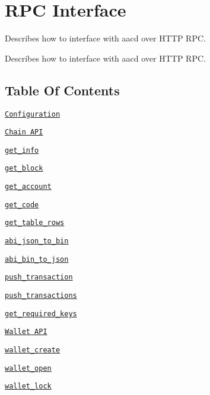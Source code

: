 \hypertarget{group__aaciorpc}{}\section{R\+PC Interface}
\label{group__aaciorpc}


Describes how to interface with aacd over H\+T\+TP R\+PC.  


Describes how to interface with aacd over H\+T\+TP R\+PC. 

\hypertarget{group__aaciorpc_tableofcontent}{}\subsection{Table Of Contents}\label{group__aaciorpc_tableofcontent}

\begin{DoxyItemize}
\item \href{#configuration}{\tt Configuration}
\item \href{#chainrpc}{\tt Chain A\+PI}
\begin{DoxyItemize}
\item \href{#v1chaingetinfo}{\tt get\+\_\+info}
\item \href{#v1chaingetblock}{\tt get\+\_\+block}
\item \href{#v1chaingetaccount}{\tt get\+\_\+account}
\item \href{#v1chaingetcode}{\tt get\+\_\+code}
\item \href{#v1chaingettablerows}{\tt get\+\_\+table\+\_\+rows}
\item \href{#v1chainabijsontobin}{\tt abi\+\_\+json\+\_\+to\+\_\+bin}
\item \href{#v1chainabibintojson}{\tt abi\+\_\+bin\+\_\+to\+\_\+json}
\item \href{#v1chainpushtransaction}{\tt push\+\_\+transaction}
\item \href{#v1chainpushtransactions}{\tt push\+\_\+transactions}
\item \href{#v1chaingetrequiredkeys}{\tt get\+\_\+required\+\_\+keys}
\end{DoxyItemize}
\item \href{#walletrpc}{\tt Wallet A\+PI}
\begin{DoxyItemize}
\item \href{#v1walletcreate}{\tt wallet\+\_\+create}
\item \href{#v1walletopen}{\tt wallet\+\_\+open}
\item \href{#v1walletlock}{\tt wallet\+\_\+lock}

\end{DoxyItemize}
\end{DoxyItemize}
